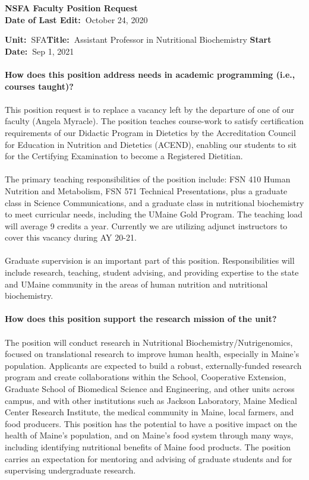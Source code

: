 \documentclass[11pt]{article}
\begin{document}
\sloppy \rmfamily
\begin{center}\textbf{NSFA Faculty Position Request\\Date of Last Edit:~}October 24, 2020\end{center}

\noindent\textbf{Unit:~}SFA\hfill\textbf{Title:~}Assistant Professor in Nutritional Biochemistry \hfill \textbf{Start Date:~}Sep 1, 2021\\~\\
\textbf{How does this position address needs in academic programming (i.e., courses taught)?}\\~\\
\small\sffamily 
This position request is to replace a vacancy left by the departure of one of our faculty (Angela Myracle). The position teaches course-work to satisfy certification requirements of our Didactic Program in Dietetics by the Accreditation Council for Education in Nutrition and Dietetics (ACEND), enabling our students to sit for the Certifying Examination to become a Registered Dietitian.
\\~\\
The primary teaching responsibilities of the position include: FSN 410 Human Nutrition and Metabolism, FSN 571 Technical Presentations, plus a graduate class in Science Communications, and a graduate class in nutritional biochemistry to meet curricular needs, including the UMaine Gold Program. The teaching load will average 9 credits a year. Currently we are utilizing adjunct instructors to cover this vacancy during AY 20-21.
\\~\\
Graduate supervision is an important part of this position. Responsibilities will include research, teaching, student advising, and providing expertise to the state and UMaine community in the areas of human nutrition and nutritional biochemistry.\\~\\
\vfill
\noindent\textbf{\rmfamily How does this position support the research mission of the unit?}\\~\\
The position will conduct research in Nutritional Biochemistry/Nutrigenomics, focused on translational  research to improve human health, especially in Maine's population. Applicants are expected to build a robust, externally-funded research program and create collaborations within the School, Cooperative Extension, Graduate School of Biomedical Science and Engineering, and other units across campus, and with other institutions such as Jackson Laboratory, Maine Medical Center Research Institute, the medical community in Maine, local farmers, and food producers. This position has the potential to have a positive impact on the health of Maine's population, and on Maine's food system through many ways, including identifying nutritional benefits of Maine food products. The position carries an expectation for mentoring and advising of graduate students and for supervising undergraduate research.
\end{document}
